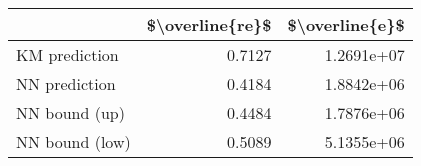 \begin{tabular}{lrr}
\toprule
{} &  \$\textbackslash overline\{re\}\$ &  \$\textbackslash overline\{e\}\$ \\
\midrule
KM prediction  &           0.7127 &      1.2691e+07 \\
NN prediction  &           0.4184 &      1.8842e+06 \\
NN bound (up)  &           0.4484 &      1.7876e+06 \\
NN bound (low) &           0.5089 &      5.1355e+06 \\
\bottomrule
\end{tabular}
